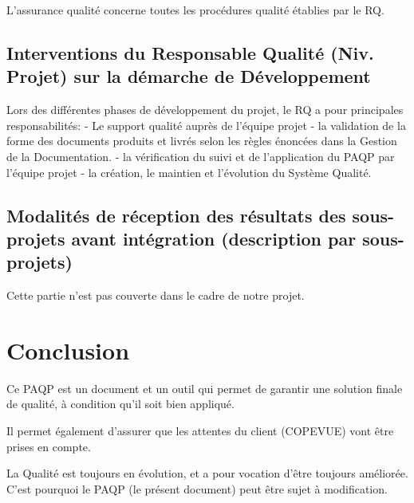 \documentclass[a4paper]{article}
\begin{document}
L'assurance qualité concerne toutes les procédures qualité établies par le RQ.

\subsection{Interventions du Responsable Qualité (Niv. Projet) sur la démarche de Développement}

Lors des différentes phases de développement du projet, le RQ a pour principales responsabilités: - Le support qualité auprès de l'équipe projet - la validation de la forme des documents produits et livrés selon les règles énoncées dans la Gestion de la Documentation. - la vérification du suivi et de l'application du PAQP par l'équipe projet - la création, le maintien et l'évolution du Système Qualité.

\subsection{Modalités de réception des résultats des sous-projets avant intégration (description par sous-projets)}
Cette partie n'est pas couverte dans le cadre de notre projet.

\section{Conclusion}

Ce PAQP est un document et un outil qui permet de garantir une solution finale de qualité, à condition qu'il soit bien appliqué.

Il permet également d'assurer que les attentes du client (COPEVUE) vont être prises en compte.

La Qualité est toujours en évolution, et a pour vocation d'être toujours améliorée. C'est pourquoi le PAQP (le présent document) peut être sujet à modification.
\end{document}
